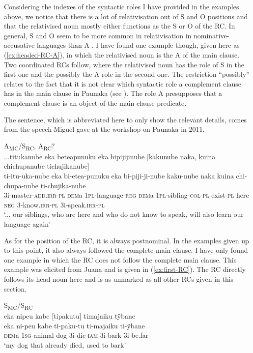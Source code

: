 Considering the indexes of the syntactic roles I have provided in the examples above, we notice that there is a lot of relativisation out of S and O positions and that the relativised noun mostly either functions as the S or O of the RC. In general, S and O seem to be more common in relativisation in nominative-accusative languages than A \citep[199]{Cristofaro2003}. I have found one example though, given here as (\ref{ex:headed-RC-A}), in which the relativised noun is the A of the main clause. Two coordinated RCs follow, where the relativised noun has the role of S in the first one and the possibly the A role in the second one. The restriction “possibly” relates to the fact that it is not clear which syntactic role a complement clause has in the main clause in Paunaka (see ). The role A presupposes that a complement clause is an object of the main clause predicate.

The sentence, which is abbreviated here to only show the relevant details, comes from the speech Miguel gave at the workshop on Paunaka in 2011.

\ea\label{ex:headed-RC-A}
\begingl
\glpreamble \textup{A\textsubscript{MC}/S\textsubscript{RC}, A\textsubscript{RC}?}\\...titukanube eka beteapunuku eka bipijijinube \textup{[}kakunube naka, kuina chichupanube tichujikanube\textup{]}\\
\gla ti-itu-uka-nube eka bi-etea-punuku eka bi-piji-ji-nube kaku-nube naka kuina chi-chupa-nube ti-chujika-nube\\
\glb 3i-master-\textsc{add.irr}-\textsc{pl} \textsc{dem}a 1\textsc{pl}-language-\textsc{reg} \textsc{dem}a 1\textsc{pl}-sibling-\textsc{col}-\textsc{pl} exist-\textsc{pl} here \textsc{neg} 3-know.\textsc{irr}-\textsc{pl} 3i-speak.\textsc{irr}-\textsc{pl}\\
\glft ‘... our siblings, who are here and who do not know to speak, will also learn our language again’
\endgl
\trailingcitation{[mxx-x110917.18]}
\xe

As for the position of the RC, it is always postnominal. In the examples given up to this point, it also always followed the complete main clause. I have only found one example in which the RC does not follow the complete main clause. This example was elicited from Juana and is given in (\ref{ex:first-RC}). The RC directly follows its head noun here and is as unmarked as all other RCs given in this section.

\ea\label{ex:first-RC}
\begingl
\glpreamble \textup{S\textsubscript{MC}/S\textsubscript{RC}}\\eka nipeu kabe \textup{[}tipakutu\textup{]} timajaiku tÿbane\\
\gla eka ni-peu kabe ti-paku-tu ti-majaiku ti-ÿbane\\
\glb \textsc{dem}a 1\textsc{sg}-animal dog 3i-die-\textsc{iam} 3i-bark 3i-be.far\\
\glft ‘my dog that already died, used to bark’
\endgl
\trailingcitation{[jxx-a110923l.07]}
\xe
 
